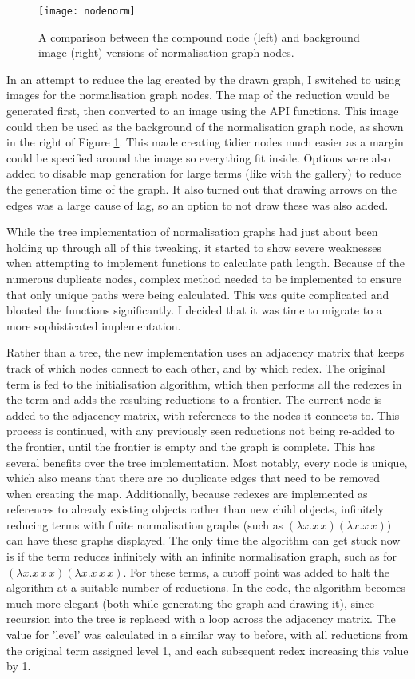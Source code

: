 \documentclass[11pt]{article}
\begin{document}
\begin{figure}
    \centering
    \texttt{[image: nodenorm]}
    \caption{A comparison between the compound node (left) and background image (right) versions of normalisation graph nodes.}
    \label{fig:normnodes}
\end{figure}

In an attempt to reduce the lag created by the drawn graph, I switched to using images for the normalisation graph nodes. The map of the reduction would be generated first, then converted to an image using the API functions. This image could then be used as the background of the normalisation graph node, as shown in the right of Figure \ref{fig:normnodes}. This made creating tidier nodes much easier as a margin could be specified around the image so everything fit inside. Options were also added to disable map generation for large terms (like with the gallery) to reduce the generation time of the graph. It also turned out that drawing arrows on the edges was a large cause of lag, so an option to not draw these was also added. 

While the tree implementation of normalisation graphs had just about been holding up through all of this tweaking, it started to show severe weaknesses when attempting to implement functions to calculate path length. Because of the numerous duplicate nodes, complex method needed to be implemented to ensure that only unique paths were being calculated. This was quite complicated and bloated the functions significantly. I decided that it was time to migrate to a more sophisticated implementation.

Rather than a tree, the new implementation uses an adjacency matrix that keeps track of which nodes connect to each other, and by which redex. The original term is fed to the initialisation algorithm, which then performs all the redexes in the term and adds the resulting reductions to a frontier. The current node is added to the adjacency matrix, with references to the nodes it connects to. This process is continued, with any previously seen reductions not being re-added to the frontier, until the frontier is empty and the graph is complete. This has several benefits over the tree implementation. Most notably, every node is unique, which also means that there are no duplicate edges that need to be removed when creating the map. Additionally, because redexes are implemented as references to already existing objects rather than new child objects, infinitely reducing terms with finite normalisation graphs (such as $(\lambda x. x \, x)(\lambda x. x \, x)$) can have these graphs displayed. The only time the algorithm can get stuck now is if the term reduces infinitely with an infinite normalisation graph, such as for $(\lambda x. x \, x \, x)(\lambda x. x \, x \, x)$. For these terms, a cutoff point was added to halt the algorithm at a suitable number of reductions. In the code, the algorithm becomes much more elegant (both while generating the graph and drawing it), since recursion into the tree is replaced with a loop across the adjacency matrix. The value for 'level' was calculated in a similar way to before, with all reductions from the original term assigned level 1, and each subsequent redex increasing this value by 1.
\end{document}
